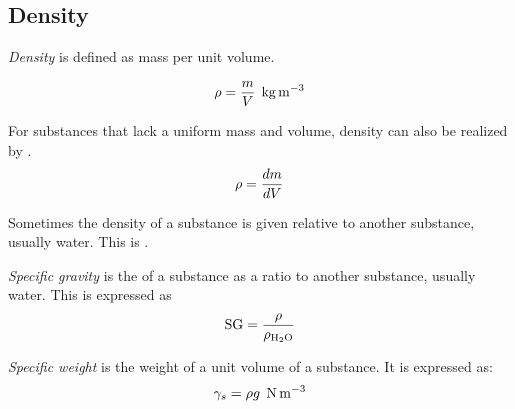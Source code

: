 \subsection{Density}\label{subsec:Density}
\begin{definition}[Density]\label{def:Density}
  \emph{Density} is defined as mass per unit volume.

  \begin{equation}\label{eq:Density}
    \rho = \frac{m}{V} \:\: \si{\kilo\gram\per\meter\cubed}
  \end{equation}
\end{definition}

For substances that lack a uniform mass and volume, density can also be realized by .
\begin{equation}\label{eq:Differential_Density}
  \rho = \frac{d m}{d V}
\end{equation}

Sometimes the density of a substance is given relative to another substance, usually water.
This is .
\begin{definition}\label{def:Specific_Gravity}
  \emph{Specific gravity} is the  of a substance as a ratio to another substance, usually water.
  This is expressed as
  \begin{equation}\label{eq:Specific_Gravity}
    \mathrm{SG} = \frac{\rho}{\rho_{\mathrm{H_{2}O}}}
  \end{equation}
\end{definition}

\begin{definition}\label{def:Specific_Weight}
  \emph{Specific weight} is the weight of a unit volume of a substance.
  It is expressed as:
  \begin{equation}\label{eq:Specific_Weight}
    \gamma_{s} = \rho g \:\: \si{\newton\per\meter\cubed}
  \end{equation}
\end{definition}

